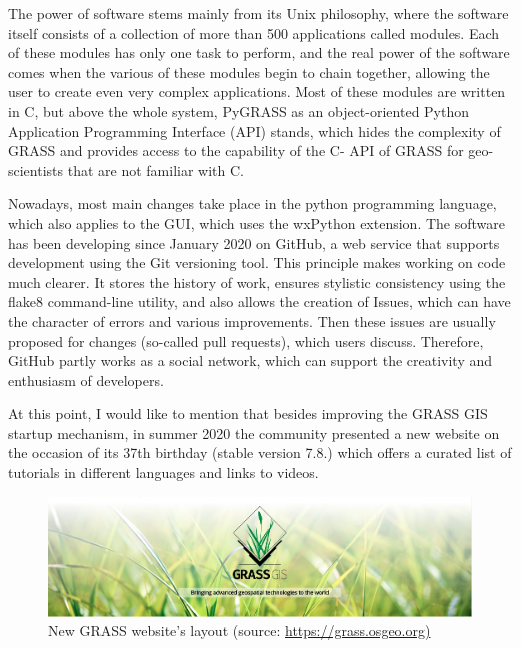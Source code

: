 \documentclass[a4paper,10pt,twoside]{article}
\begin{document}
The power of software stems mainly from its Unix philosophy, where the software itself consists of a collection of more than 500 applications called modules. Each of these modules has only one task to perform, and the real power of the software comes when the various of these modules begin to chain together, allowing the user to create even very complex applications. Most of these modules are written in C, but above the whole system, PyGRASS as an object-oriented Python Application Programming Interface (API) stands, which hides the complexity of GRASS and provides access to the capability of the C- API of GRASS for geo-scientists that are not familiar with C.

Nowadays, most main changes take place in the python programming language, which also applies to the GUI, which uses the wxPython extension. The software has been developing since January 2020 on GitHub, a web service that supports development using the Git versioning tool. This principle makes working on code much clearer. It stores the history of work, ensures stylistic consistency using the flake8 command-line utility, and also allows the creation of Issues, which can have the character of errors and various improvements. Then these issues are usually proposed for changes (so-called pull requests), which users discuss. Therefore, GitHub partly works as a social network, which can support the creativity and enthusiasm of developers.

At this point, I would like to mention that besides improving the GRASS GIS startup mechanism, in summer 2020 the community presented a new website on the occasion of its 37th birthday (stable version 7.8.) which offers a curated list of tutorials in different languages and links to videos.

\vspace{0.3cm}
\begin{figure}[hbt!]
\begin{center}
\includegraphics[width=15cm]{../pictures/grass_gis.png} 
\caption[New GRASS website's layout]{New GRASS website's layout (source: \url{https://grass.osgeo.org)}}
\label{fig:grass_gis}
\end{center}
\end{figure}
\end{document}
